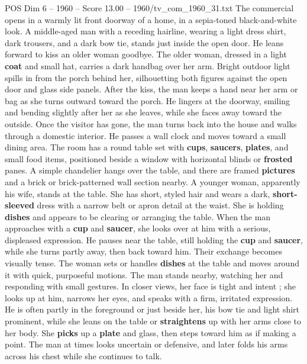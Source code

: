 \begin{textsample}{POS Dim 6 – 1960 – Score 13.00 – 1960/tv\_com\_1960\_31.txt}  \label{ex:f6_pos_029}
The commercial opens in a warmly lit front doorway of a home, in a sepia-toned black-and-white look.
A middle-aged man with a receding hairline, wearing a light dress shirt, dark trousers, and a dark bow tie, stands just inside the open door.
He leans forward to kiss an older woman goodbye.
The older woman, dressed in a light \textbf{coat} and small hat, carries a dark handbag over her arm.
Bright outdoor light spills in from the porch behind her, silhouetting both figures against the open door and glass side panels.
After the kiss, the man keeps a hand near her arm or bag as she turns outward toward the porch.
He lingers at the doorway, smiling and bending slightly after her as she leaves, while she faces away toward the outside.
Once the visitor has gone, the man turns back into the house and walks through a domestic interior.
He passes a wall clock and moves toward a small dining area.
The room has a round table set with \textbf{cups}, \textbf{saucers}, \textbf{plates}, and small food items, positioned beside a window with horizontal blinds or \textbf{frosted} panes.
A simple chandelier hangs over the table, and there are framed \textbf{pictures} and a brick or brick-patterned wall section nearby.
A younger woman, apparently his wife, stands at the table.
She has short, styled hair and wears a dark, \textbf{short-sleeved} dress with a narrow belt or apron detail at the waist.
She is holding \textbf{dishes} and appears to be clearing or arranging the table.
When the man approaches with a \textbf{cup} and \textbf{saucer}, she looks over at him with a serious, displeased expression.
He pauses near the table, still holding the \textbf{cup} and \textbf{saucer}, while she turns partly away, then back toward him.
Their exchange becomes visually tense.
The woman sets or handles \textbf{dishes} at the table and moves around it with quick, purposeful motions.
The man stands nearby, watching her and responding with small gestures.
In closer views, her face is tight and intent ; she looks up at him, narrows her eyes, and speaks with a firm, irritated expression.
He is often partly in the foreground or just beside her, his bow tie and light shirt prominent, while she leans on the table or \textbf{straightens} up with her arms close to her body.
She \textbf{picks} up a \textbf{plate} and glass, then steps toward him as if making a point.
The man at times looks uncertain or defensive, and later folds his arms across his chest while she continues to talk.

\end{textsample}
